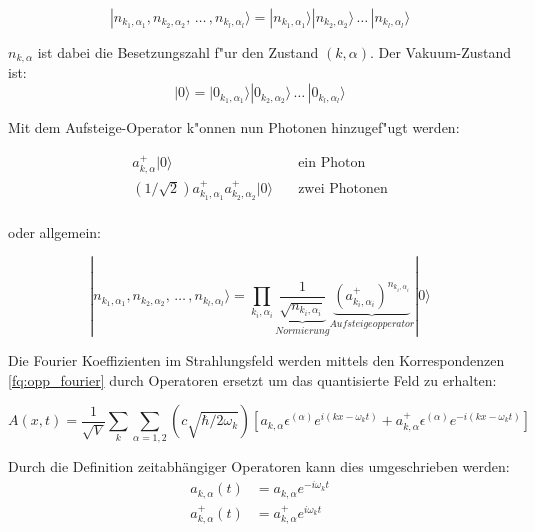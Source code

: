 \begin{equation}
|n_{k_1,\alpha_1}, n_{k_2,\alpha_2}, \, \hdots \, , n_{k_l,\alpha_l}\rangle = |n_{k_1,\alpha_1}\rangle |n_{k_2,\alpha_2}\rangle \, \hdots \, |n_{k_l,\alpha_l}\rangle
\end{equation}

$n_{k,\alpha}$ ist dabei die Besetzungszahl f"ur den Zustand $(k,\alpha)$. Der Vakuum-Zustand ist:
\begin{equation}
|0\rangle = |0_{k_1,\alpha_1}\rangle |0_{k_2,\alpha_2}\rangle \, \hdots \, |0_{k_l,\alpha_l}\rangle
\end{equation}

Mit dem Aufsteige-Operator k"onnen nun Photonen hinzugef"ugt werden:

\begin{equation}
\begin{split}
a^+_{k,\alpha}|0\rangle & \quad \text{ein Photon}\\
\left(1/\sqrt{2}\right)a^+_{k_1,\alpha_1}a^+_{k_2,\alpha_2}|0\rangle & \quad \text{zwei Photonen}\\
\end{split}
\end{equation}

oder allgemein:

\begin{equation}
|n_{k_1,\alpha_1}, n_{k_2,\alpha_2}, \, \hdots \, , n_{k_l,\alpha_l}\rangle =
 \prod_{k_i,\alpha_i}\underbrace{\frac{1}{\sqrt{n_{k_i,\alpha_i}}}}_{Normierung} \underbrace{(a^+_{k_i,\alpha_i})^{n_{k_i,\alpha_i}}}_{Aufsteigeopperator} |0\rangle
\end{equation}

Die Fourier Koeffizienten im Strahlungsfeld werden mittels den Korrespondenzen \ref{fq:opp_fourier} durch Operatoren ersetzt um das quantisierte Feld zu erhalten:

\begin{equation}
A(x,t) = \frac{1}{\sqrt{V}} \sum_k \sum_{\alpha=1,2} \left(c \sqrt{\hbar/2 \omega_k}\right)\left[a_{k,\alpha} \epsilon^{(\alpha)} e^{i (kx - \omega_k t)} + a^+_{k,\alpha} \epsilon^{(\alpha)} e^{-i (kx - \omega_k t)}\right]
\end{equation}

Durch die Definition zeitabhängiger Operatoren kann dies umgeschrieben werden:
\begin{equation}
\begin{split}
a_{k,\alpha}(t) &= a_{k,\alpha} e^{-i \omega_k t} \\
a^+_{k,\alpha}(t) &= a^+_{k,\alpha} e^{i \omega_k t}
\end{split}
\end{equation}

